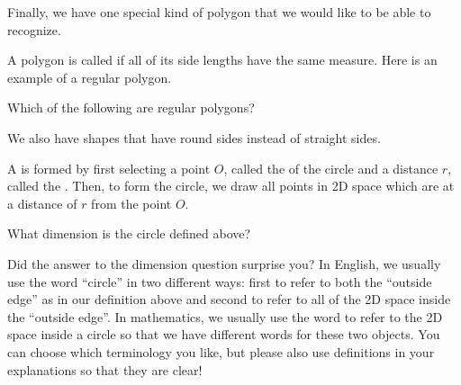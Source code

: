 \documentclass{ximera}
\begin{document}
Finally, we have one special kind of polygon that we would like to be able to recognize.
\begin{definition}
	A polygon is called  if all of its side lengths have the same measure. Here is an example of a regular polygon.
	\begin{center}
	\end{center}
\end{definition}

\begin{question}
Which of the following are regular polygons?
\begin{selectAll}
\end{selectAll}
\end{question}

We also have shapes that have round sides instead of straight sides.
\begin{definition}
A  is formed by first selecting a point $O$, called the  of the circle and a distance $r$, called the . Then, to form the circle, we draw all points in 2D space which are at a distance of $r$ from the point $O$.
\end{definition}

\begin{question}
	What dimension is the circle defined above?
	\begin{prompt}
		\begin{multipleChoice}
		\end{multipleChoice}
	\end{prompt}
\end{question}
Did the answer to the dimension question surprise you? In English, we usually use the word ``circle'' in two different ways: first to refer to both the ``outside edge'' as in our definition above and second to refer to all of the 2D space inside the ``outside edge''. In mathematics, we usually use the word  to refer to the 2D space inside a circle so that we have different words for these two objects. You can choose which terminology you like, but please also use definitions in your explanations so that they are clear!
\end{document}
